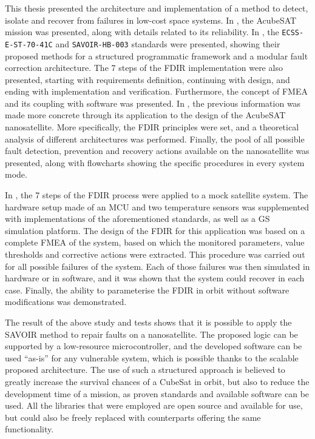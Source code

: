 \documentclass[a4paper,nobib]{tufte-book}
\begin{document}
\begin{fullwidth}
This thesis presented the architecture and implementation of a method to detect, isolate and recover from failures in low-cost space systems. In , the AcubeSAT mission was presented, along with details related to its reliability. In , the \texttt{ECSS-E-ST-70-41C} and \texttt{SAVOIR-HB-003} standards were presented, showing their proposed methods for a structured programmatic framework and a modular fault correction architecture. The 7 steps of the \acs{FDIR} implementation were also presented, starting with requirements definition, continuing with design, and ending with implementation and verification. Furthermore, the concept of \acf{FMEA} and its coupling with software was presented. In , the previous information was made more concrete through its application to the design of the AcubeSAT nanosatellite. More specifically, the \acs{FDIR} principles were set, and a theoretical analysis of different architectures was performed. Finally, the pool of all possible fault detection, prevention and recovery actions available on the nanosatellite was presented, along with flowcharts showing the specific procedures in every system mode.

In , the 7 steps of the \acs{FDIR} process were applied to a mock satellite system. The hardware setup made of an \acs{MCU} and two temperature sensors was supplemented with implementations of the aforementioned standards, as well as a \acl{GS} simulation platform. The design of the \acs{FDIR} for this application was based on a complete \acs{FMEA} of the system, based on which the monitored parameters, value thresholds and corrective actions were extracted. This procedure was carried out for all possible failures of the system. Each of those failures was then simulated in hardware or in software, and it was shown that the system could recover in each case. Finally, the ability to parameterise the \acs{FDIR} in orbit without software modifications was demonstrated.

The result of the above study and tests shows that it is possible to apply the \acs{SAVOIR} method to repair faults on a nanosatellite. The proposed logic can be supported by a low-resource microcontroller, and the developed software can be used ``as-is'' for any vulnerable system, which is possible thanks to the scalable proposed architecture. The use of such a structured approach is believed to greatly increase the survival chances of a CubeSat in orbit, but also to reduce the development time of a mission, as proven standards and available software can be used. All the libraries that were employed are open source and available for use, but could also be freely replaced with counterparts offering the same functionality.


\end{fullwidth}
\end{document}
